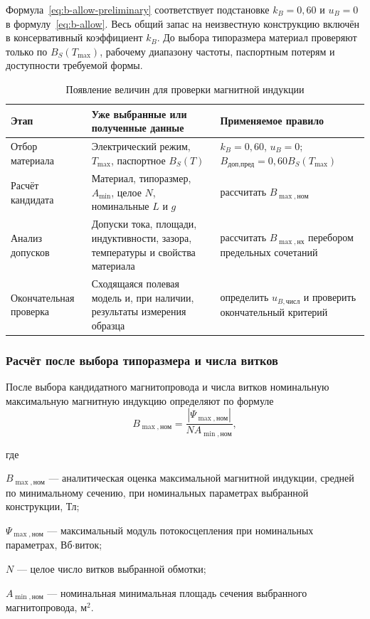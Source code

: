 \documentclass[14pt,a4paper]{extarticle}
\newenvironment{whereblock}
 {\par\noindent где\par
  \begin{list}{}{\setlength{\leftmargin}{12.5mm}
                  \setlength{\itemindent}{-12.5mm}
                  \setlength{\itemsep}{0pt}
                  \setlength{\parsep}{0pt}
                  \setlength{\topsep}{0pt}}}
 {\end{list}}
\newcommand{\whereitem}[2]{\item[] #1 --- #2}
\begin{document}
Формула~\eqref{eq:b-allow-preliminary} соответствует подстановке
$k_B=0{,}60$ и $u_B=0$ в формулу~\eqref{eq:b-allow}. Весь общий запас
на неизвестную конструкцию включён в консервативный коэффициент $k_B$.
До выбора типоразмера материал проверяют только по
$B_S(T_{\max})$, рабочему диапазону частоты, паспортным потерям и
доступности требуемой формы.

\begin{table}[H]
\caption{Появление величин для проверки магнитной индукции}
\label{tab:b-uncertainty-stages}
\centering
\small
\begin{tabularx}{\textwidth}{
>{\raggedright\arraybackslash}p{30mm}
>{\raggedright\arraybackslash}p{52mm}
>{\raggedright\arraybackslash}X}
\toprule
Этап & Уже выбранные или полученные данные & Применяемое правило \\
\midrule
Отбор материала &
Электрический режим, $T_{\max}$, паспортное $B_S(T)$ &
$k_B=0{,}60$, $u_B=0$;
$B_{\text{доп,пред}}=0{,}60B_S(T_{\max})$ \\
Расчёт кандидата &
Материал, типоразмер, $A_{\min}$, целое $N$, номинальные $L$ и $g$ &
рассчитать $B_{\max,\text{ном}}$ \\
Анализ допусков &
Допуски тока, площади, индуктивности, зазора, температуры и свойства
материала &
рассчитать $B_{\max,\text{нх}}$ перебором предельных сочетаний \\
Окончательная проверка &
Сходящаяся полевая модель и, при наличии, результаты измерения образца &
определить $u_{B,\text{числ}}$ и проверить окончательный критерий \\
\bottomrule
\end{tabularx}
\end{table}

\subsubsection{Расчёт после выбора типоразмера и числа витков}

После выбора кандидатного магнитопровода и числа витков номинальную
максимальную магнитную индукцию определяют по формуле
\begin{equation}
 B_{\max,\text{ном}}=
 \frac{
 \left|\Psi_{\max,\text{ном}}\right|
 }{
 N A_{\min,\text{ном}}
 },
 \label{eq:bmax-nominal}
\end{equation}
\begin{whereblock}
\whereitem{$B_{\max,\text{ном}}$}{аналитическая оценка максимальной
магнитной индукции, средней по минимальному сечению, при номинальных
параметрах выбранной конструкции, Тл;}
\whereitem{$\Psi_{\max,\text{ном}}$}{максимальный модуль потокосцепления
при номинальных параметрах, Вб$\cdot$виток;}
\whereitem{$N$}{целое число витков выбранной обмотки;}
\whereitem{$A_{\min,\text{ном}}$}{номинальная минимальная площадь
сечения выбранного магнитопровода, м$^2$.}
\end{whereblock}
\end{document}
